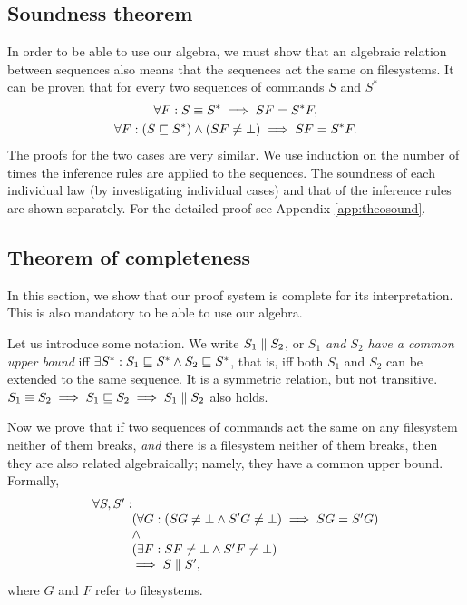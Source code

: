 \begin{table}[H]
\subsection{Soundness theorem}
\label{theorem:soundness}
In order to be able to use our algebra,
we must show that an algebraic relation between sequences also means
that the sequences act the same on filesystems.
%
It can be proven that for every two sequences of commands
\(S\) and \(S^*\) 
\begin{gather*}
\forall F: S\equiv S^* \implies SF=S^*F,\\
\forall F: (S\sqsubseteq S^*)\wedge(SF\ne\bot)\implies SF=S^*F.
\end{gather*}
The proofs for the two cases are very similar. We use induction on the
number of times the inference rules are applied to the sequences.
The soundness of each individual law
(by investigating individual cases)
and that of the inference rules are shown separately.
For the detailed proof see Appendix \ref{app:theosound}.

\subsection{Theorem of completeness}
\label{theorem:completeness}
In this section, we show that our proof system is complete for its
interpretation. This is also mandatory to be able to use our algebra.

Let us introduce some notation. We write 
\(S_1\parallel S_2\), or \emph{\(S_1\) and \(S_2\) have a common upper 
bound} iff
\(\exists S^*: S_1\sqsubseteq S^* \wedge S_2\sqsubseteq S^*\), that is, iff
both \(S_1\) and \(S_2\) can be extended to the same sequence.
It is a symmetric relation, but not transitive.
\(S_1\equiv S_2\implies S_1\sqsubseteq S_2\implies S_1\parallel S_2\) also
holds.

Now we prove that if 
two sequences of commands act the same on any filesystem neither of
them breaks, \emph{and} there is a filesystem neither of them
breaks, then they are also related algebraically; namely, they have a common upper bound.
Formally, 
\[\begin{array}{r@{}l}
\forall S,S':&\\ 
&(\forall G: (SG\ne\ud\wedge S'G\ne\ud)\implies SG=S'G)\\
&\wedge\\
&(\exists F: SF\ne\ud\wedge S'F\ne\ud)\\
&\implies S \eqifnbr S',
\end{array}\]
where \(G\) and \(F\) refer to filesystems. 



\end{table}

